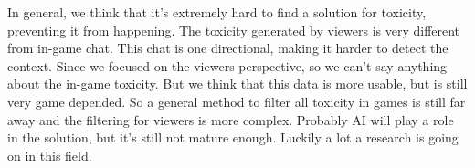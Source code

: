 \documentclass[final]{report}
\begin{document}
In general, we think that it's extremely hard to find a solution for toxicity, preventing it from happening. The toxicity generated by viewers is very different from in-game chat. This chat is one directional, making it harder to detect the context. Since we focused on the viewers perspective, so we can't say anything about the in-game toxicity. But we think that this data is more usable, but is still very game depended. So a general method to filter all toxicity in games is still far away and the filtering for viewers is more complex. Probably AI will play a role in the solution, but it's still not mature enough. Luckily a lot a research is going on in this field.
\end{document}
